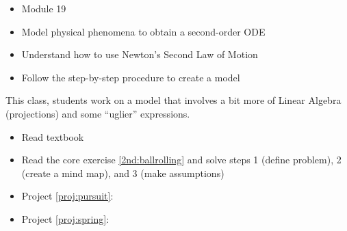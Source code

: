 \begin{lesson}

	\begin{itemize}
		\item Module 19
	\end{itemize}
	
	\begin{itemize}
		\item Model physical phenomena to obtain a second-order ODE
		\item Understand how to use Newton's Second Law of Motion
		\item Follow the step-by-step procedure to create a model
	\end{itemize}
	

This class, students work on a model that involves a bit more of Linear Algebra (projections) and some ``uglier'' expressions.


\begin{itemize}
	\item Read textbook
	\item Read the core exercise \ref{2nd:ballrolling} and solve steps 1 (define problem), 2 (create a mind map), and 3 (make assumptions)
\end{itemize}

\begin{itemize}
	\item Project \ref{proj:pursuit}: \pursuittitle
	\item Project \ref{proj:spring}: \springtitle
\end{itemize}


\end{lesson}


